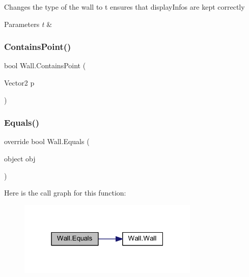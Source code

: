 Changes the type of the wall to t ensures that display\+Infos are kept correctly 


\begin{DoxyParams}{Parameters}
{\em t} & \\
\hline
\end{DoxyParams}
\mbox{\label{class_wall_a268f71deeceb999a03235e62b43421c2}} 
\subsubsection{\texorpdfstring{Contains\+Point()}{ContainsPoint()}}
{\footnotesize\ttfamily bool Wall.\+Contains\+Point (\begin{DoxyParamCaption}\item[{Vector2}]{p }\end{DoxyParamCaption})}

\mbox{\label{class_wall_a1f2892cd73109765a83ddeda382309eb}} 
\subsubsection{\texorpdfstring{Equals()}{Equals()}}
{\footnotesize\ttfamily override bool Wall.\+Equals (\begin{DoxyParamCaption}\item[{object}]{obj }\end{DoxyParamCaption})}

Here is the call graph for this function\+:
\nopagebreak
\begin{figure}[H]
\begin{center}
\leavevmode
\includegraphics[width=244pt]{class_wall_a1f2892cd73109765a83ddeda382309eb_cgraph}
\end{center}
\end{figure}
\mbox{\label{class_wall_a4c40b2b1afaf636c50cc2ff7597442e9}} 
